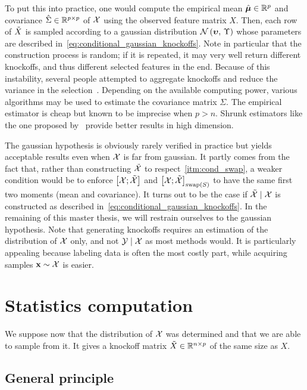To put this into practice, one would compute the empirical mean
$\hat{\bm{\mu}} \in \mathbb{R}^p$ and covariance $\hat{\Sigma} \in \mathbb{R}^{p \times p}$ of $\mathcal{X}$
using the observed feature matrix $X$.
Then, each row of $\tilde{X}$ is sampled according to a gaussian distribution $\mathcal{N}\left( \bm{\upsilon},\, \Upsilon \right)$
whose parameters are described in~\ref{eq:conditional_gaussian_knockoffs}.
Note in particular that the construction process is random;
if it is repeated, it may very well return different knockoffs, and thus different
selected features in the end.
Because of this instability,
several people attempted to aggregate knockoffs
and reduce the variance in the selection~\citep{improve_stability_knockoffs, aggregation_knockoffs, aggregated_fdr}.
Depending on the available computing power,
various algorithms may be used to estimate the covariance matrix $\Sigma$.
The empirical estimator is cheap but known to be imprecise when $p > n$.
Shrunk estimators like the one proposed by~\cite{ledoit_wolf} provide better results in high dimension.

\bigbreak
The gaussian hypothesis is obviously rarely verified in practice but yields acceptable results even when
$\mathcal{X}$ is far from gaussian.
It partly comes from the fact that, rather than constructing $\tilde{\mathcal{X}}$ to respect~\ref{itm:cond_swap},
a weaker condition would be to enforce $\big[ \mathcal{X}; \tilde{\mathcal{X}} \big]$ and $\big[ \mathcal{X}; \tilde{\mathcal{X}} \big]_{\operatorname{swap}(S)}$ to have the
same first two moments (mean and covariance).
It turns out to be the case if $\tilde{\mathcal{X}} \mid \mathcal{X}$ is constructed as described in~\ref{eq:conditional_gaussian_knockoffs}.
In the remaining of this master thesis, we will restrain ourselves to the gaussian hypothesis.
Note that generating knockoffs requires an estimation of the distribution of $\mathcal{X}$ only,
and not $\mathcal{Y} \mid \mathcal{X}$ as most methods would.
It is particularly appealing because labeling data is often the most costly part,
while acquiring samples $\mathbf{x} \sim \mathcal{X}$ is easier.

\section{Statistics computation}\label{sec:ksc}

We suppose now that the distribution of $\mathcal{X}$ was determined and that we are able to sample from it.
It gives a knockoff matrix $\tilde{X} \in \mathbb{R}^{n \times p}$ of the same size as $X$.

\subsection{General principle}\label{subsec:scg}

